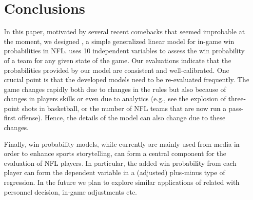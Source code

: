 \section{Conclusions}
\label{sec:conclusions}

In this paper, motivated by several recent comebacks that seemed improbable at the moment, we designed {\method}, a simple generalized linear model for in-game win probabilities in NFL. 
{\method} uses 10 independent variables to assess the win probability of a team for any given state of the game. 
Our evaluations indicate that the probabilities provided by our model are consistent and well-calibrated. 
One crucial point is that the developed models need to be re-evaluated frequently.  
The game changes rapidly both due to changes in the rules but also because of changes in players skills or even due to analytics (e.g., see the explosion of three-point shots in basketball, or the number of NFL teams that are now run a pass-first offense).  
Hence, the details of the model can also change due to these changes.  

Finally, win probability models, while currently are mainly used from media in order to enhance sports storytelling, can form a central component for the evaluation of NFL players. 
In particular, the added win probability from each player can form the dependent variable in a (adjusted) plus-minus type of regression. 
In the future we plan to explore similar applications of {\method} related with personnel decision, in-game adjustments etc.